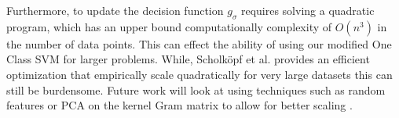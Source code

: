 \documentclass[10pt, conference]{ieeeconf}      %
\begin{document}
Furthermore, to update the decision function $g_{\sigma}$ requires solving a quadratic program, which has an upper bound computationally complexity of $O(n^3)$ in the number of data points. This can effect the ability of using our modified One Class SVM for larger problems. While, Scholk{\"o}pf et al. provides an efficient optimization that empirically scale quadratically \cite{scholkopf2001estimating} for very large datasets this can still be burdensome. Future work will look at using techniques such as random features or PCA on the kernel Gram matrix to allow for better scaling \cite{scholkopf2002learning}.
  
 






\end{document}
